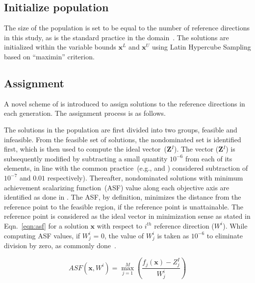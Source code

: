 \subsection{Initialize population}
\label{subsec:initialize}
The size of the population is set to be equal to the number of reference directions in this study, as is the standard practice in the domain~\cite{zhang2007moead,Li2015dominance,Deb2014box,Asafmany2015}. The solutions are initialized within the variable bounds $\textbf{x}^{L}$ and $\textbf{x}^{U}$ using Latin Hypercube Sampling based on ``maximin'' criterion.\\ 

\subsection{Assignment}
\label{subsec:assign}  

A novel scheme of is introduced to assign solutions to the reference directions in each generation. The assignment process is as follows.

The solutions in the population are first divided into two groups, feasible and infeasible. From the feasible set of solutions, the nondominated set is identified first, which is then used to compute the ideal vector~(\textbf{Z}$^I$). The vector (\textbf{Z}$^I$) is subsequently modified by subtracting a small quantity $10^{-6}$ from each of its elements, in line with the common practice~(e.g., \cite{Qi2014adaptive} and \cite{Goulart2016preference}) considered subtraction of $10^{-7}$ and $0.01$ respectively). Thereafter, nondominated solutions with minimum achievement scalarizing function~(ASF) value along each objective axis are identified as done in \cite{Yuan2016many}. The ASF, by definition, minimizes the distance from the reference point to the feasible region, if the reference point is unattainable. The reference point is considered as the ideal vector in minimization sense as stated in Eqn.~\ref{eqn:asf} for a solution $\mathbf{x}$ with respect to $i^{th}$ reference direction ($W^i$). While computing ASF values, if $W^i_j$ = 0, the value of $W^i_j$ is taken as $10^{-6}$ to eliminate division by zero, as commonly done~\cite{Yuan2016many}.

\begin{equation}
ASF(\textbf{x},W^i) = \max_{j = 1}^M \left(\frac{f_j(\textbf{x}) - Z_j^I}{W^i_j}\right)
\label{eqn:asf} 
\end{equation} 

